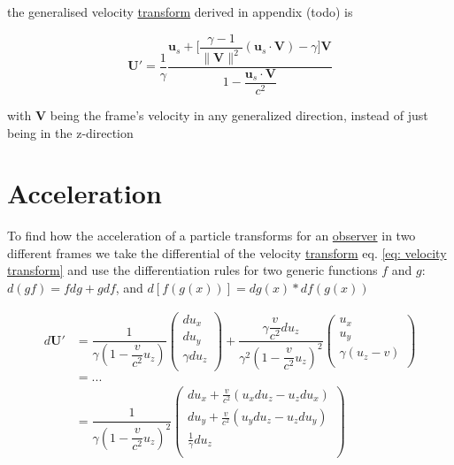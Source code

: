 the generalised velocity \hyperlink{def-transform}{transform} derived in appendix (todo) is

\begin{equation}
	\mathbf{U}' = \dfrac{1}{\gamma} \dfrac{\mathbf{u}_s + \Big[\dfrac{\gamma-1}{\|\mathbf{V}\|^2}(\mathbf{u}_s\cdot \mathbf{V})- \gamma \Big] \mathbf{V}}{1 - \dfrac{\mathbf{u}_s\cdot\mathbf{V}}{c^2}}
\end{equation}

with $\mathbf{V}$ being the frame's velocity in any generalized direction, instead of just being in the z-direction

\section{Acceleration}

To find how the acceleration of a particle transforms for an \hyperlink{def-observer}{observer} in two different frames we take the differential of the velocity \hyperlink{def-transform}{transform} eq. \eqref{eq: velocity transform} and use the differentiation rules for two generic functions $f$ and $g$: $d(gf)=f dg+g df$, and $d[f(g(x))]= dg(x) * df(g(x))$

\begin{equation}
	\begin{aligned}
		d\mathbf{U}' & = \dfrac{1}{\gamma\left(1- \dfrac{v}{c^2} u_z\right) }
		\begin{pmatrix}
			du_x        \\
			du_y        \\
			\gamma du_z \\
		\end{pmatrix}
		+ \dfrac{\gamma \dfrac{v}{c^2} du_z}{\gamma^2\left(1- \dfrac{v}{c^2} u_z\right)^2 }
		\begin{pmatrix}
			u_x                           \\
			u_y                           \\
			\gamma \left( u_z - v \right) \\
		\end{pmatrix}                                           \\
		             & = ...                                                    \\
		             & = \dfrac{1}{\gamma\left(1- \dfrac{v}{c^2} u_z\right)^2 }
		\begin{pmatrix}
			du_x + \frac{v}{c^2}( u_x du_z - u_z du_x) \\
			du_y + \frac{v}{c^2}( u_y du_z - u_z du_y) \\
			\frac{1}{\gamma} du_z                      \\
		\end{pmatrix}
	\end{aligned}
\end{equation}

